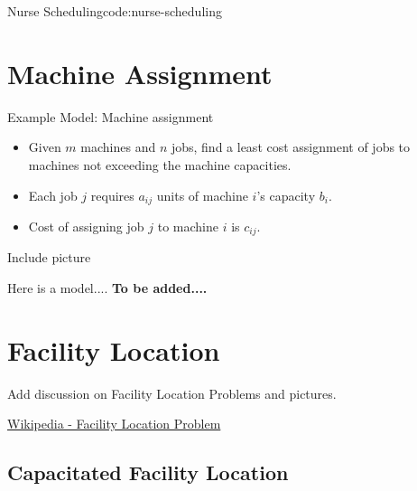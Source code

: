 \documentclass[../open-optimization/open-optimization.tex]{subfiles}
\begin{document}
\begin{examplewithcode}{Nurse Scheduling}{code:nurse-scheduling}

\end{examplewithcode}

\section{Machine Assignment}


Example Model: Machine assignment\\

\begin{minipage}{0.6\textwidth}
\begin{itemize}
	\item Given $m$ machines and $n$ jobs, find a least cost assignment
	of jobs to machines not exceeding the machine capacities.
	\item Each job $j$ requires $a_{ij}$ units of machine $i$'s capacity $b_i$.
	\item Cost of assigning job $j$ to machine $i$ is $c_{ij}$.
	\end{itemize}
\end{minipage}
\begin{minipage}{0.3\textwidth}
\begin{todo}
Include picture
\end{todo}
\end{minipage}


Here is a model....  \textbf{To be added....}

\section{Facility Location}

\begin{todo}
Add discussion on Facility Location Problems and pictures.
\end{todo}
\href{https://en.wikipedia.org/wiki/Facility_location_problem}{Wikipedia - Facility Location Problem}



\subsection{Capacitated Facility Location}
\end{document}

